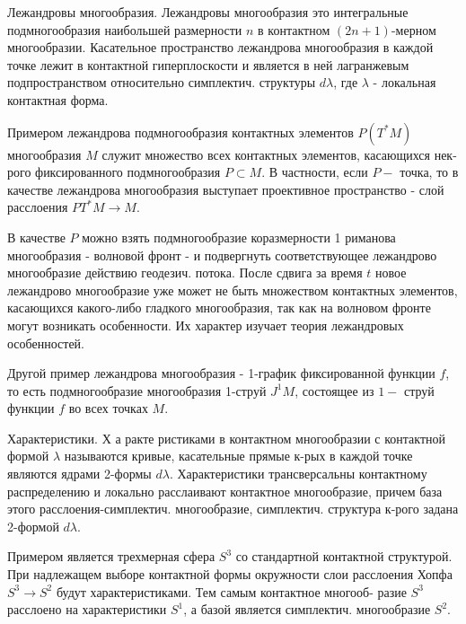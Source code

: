 \documentclass[10pt]{article}
\begin{document}
Лежандровы многообразия. Лежандровы многообразия это интегральные подмногообразия наибольшей размерности $n$ в контактном $(2 n+1)$-мерном многообразии. Касательное пространство лежандрова многообразия в каждой точке лежит в контактной гиперплоскости и является в ней лагранжевым подпространством относительно симплектич. структуры $d \lambda$, где $\lambda$ - локальная контактная форма.



Примером лежандрова подмногообразия контактных элементов $P\left(T^{*} M\right)$ многообразия $M$ служит множество всех контактных элементов, касающихся нек-рого фиксированного подмногообразия $P \subset M$. В частности, если $P-$ точка, то в качестве лежандрова многообразия выступает проективное пространство - слой расслоения $P T^{*} M \rightarrow M$.



В качестве $P$ можно взять подмногообразие коразмерности 1 риманова многообразия - волновой фронт - и подвергнуть соответствующее лежандрово многообразие действию геодезич. потока. После сдвига за время $t$ новое лежандрово многообразие уже может не быть множеством контактных элементов, касающихся какого-либо гладкого многообразия, так как на волновом фронте могут возникать особенности. Их характер изучает теория лежандровых особенностей.



Другой пример лежандрова многообразия - 1-график фиксированной функции $f$, то есть подмногообразие многообразия 1-струй $J^{1} M$, состоящее из $1-$ струй функции $f$ во всех точках $M$.



Характеристики. Х а ракте ристиками в контактном многообразии с контактной формой $\lambda$ называются кривые, касательные прямые к-рых в каждой точке являются ядрами 2-формы $d \lambda$. Характеристики трансверсальны контактному распределению и локально расслаивают контактное многообразие, причем база этого расслоения-симплектич. многообразие, симплектич. структура к-рого задана 2-формой $d \lambda$.



Примером является трехмерная сфера $S^{3}$ со стандартной контактной структурой. При надлежащем выборе контактной формы окружности слои расслоения Хопфа $S^{3} \rightarrow S^{2}$ будут характеристиками. Тем самым контактное многооб- разие $S^{3}$ расслоено на характеристики $S^{1}$, а базой является симплектич. многообразие $S^{2}$.
\end{document}
